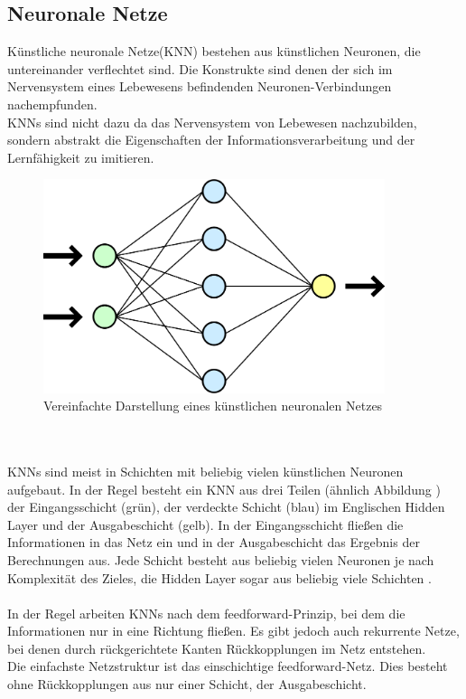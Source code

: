 \documentclass[12pt,oneside,a4paper,parskip]{scrbook}
\begin{document}
\subsection{Neuronale Netze}
Künstliche neuronale Netze(KNN) bestehen aus künstlichen Neuronen, die untereinander verflechtet sind. Die Konstrukte sind denen der sich im Nervensystem eines Lebewesens befindenden Neuronen-Verbindungen nachempfunden. \\
KNNs sind nicht dazu da das Nervensystem von Lebewesen nachzubilden, sondern abstrakt die Eigenschaften der Informationsverarbeitung und der Lernfähigkeit zu imitieren.
\begin{figure}[h]
	\begin{center}
		\includegraphics[width=10cm]{Bilder/Neurales_Netz.png}
		\caption{Vereinfachte Darstellung eines künstlichen neuronalen Netzes\cite{wikiNN2}}
		\label{fig:wikiNeuronalesNetz}
	\end{center}
\end{figure}
\\\\KNNs sind meist in Schichten mit beliebig vielen künstlichen Neuronen aufgebaut. In der Regel besteht ein KNN aus drei Teilen (ähnlich Abbildung \cite{fig:wikiNeuronalesNetz}) der Eingangsschicht (grün), der verdeckte Schicht (blau) im Englischen Hidden Layer und der Ausgabeschicht (gelb). In der Eingangsschicht fließen die Informationen in das Netz ein und in der Ausgabeschicht das Ergebnis der Berechnungen aus. Jede Schicht besteht aus beliebig vielen Neuronen je nach Komplexität des Zieles, die Hidden Layer sogar aus beliebig viele Schichten \cite{wikiNN2}.
\\\\
In der Regel arbeiten KNNs nach dem feedforward-Prinzip, bei dem die Informationen nur in eine Richtung fließen. Es gibt jedoch auch rekurrente Netze, bei denen durch rückgerichtete Kanten Rückkopplungen im Netz entstehen. \\
Die einfachste Netzstruktur ist das einschichtige feedforward-Netz. Dies besteht ohne Rückkopplungen aus nur einer Schicht, der Ausgabeschicht.
\end{document}
